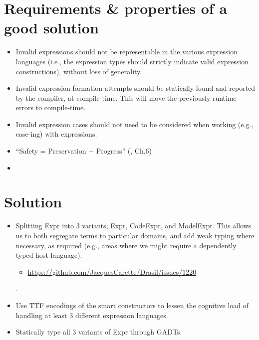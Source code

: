 \section{Requirements \& properties of a good solution}

\begin{itemize}

      \item Invalid expressions should not be representable in the various
            expression languages (i.e., the expression types should strictly
            indicate valid expression constructions), without loss of
            generality.

      \item Invalid expression formation attempts should be statically found and
            reported by the compiler, at compile-time. This will move the
            previously runtime errors to compile-time.

      \item Invalid expression cases should not need to be considered when working
            (e.g., case-ing) with expressions.

      \item ``Safety = Preservation + Progress'' (\cite{harper2016pfpl}, Ch.6)

      \item {}

\end{itemize}

\section{Solution}

\begin{itemize}

      \item Splitting Expr into 3 variants; Expr, CodeExpr, and ModelExpr.
            This allows us to both segregate terms to particular domains, and add
            weak typing where necessary, as required (e.g., areas where we might
            require a dependently typed host language).

            \begin{itemize}
            
                  \item \url{https://github.com/JacquesCarette/Drasil/issues/1220}
            
            \end{itemize}

            .

      \item Use TTF encodings of the smart constructors to lessen the cognitive
            load of handling at least 3 different expression languages.

      \item Statically type all 3 variants of Expr through GADTs.

\end{itemize}

